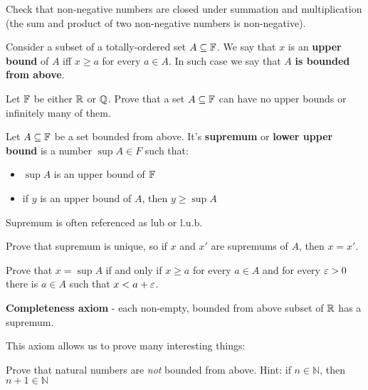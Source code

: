 \begin{exercise}
  Check that non-negative numbers are closed under summation and multiplication (the sum and product of two non-negative numbers is non-negative).
\end{exercise}

\begin{definition}
  Consider a subset of a totally-ordered set $A\subseteq \mathbb F$. We say that $x$ is an
  \textbf{upper bound} of $A$ iff $x\ge a$ for every $a\in A$.
  In such case we say that $A$ \textbf{is bounded from above}.
\end{definition}

\begin{exercise}
  Let $\mathbb F$ be either $\mathbb R$ or $\mathbb Q$. Prove that a set $A\subseteq \mathbb {\mathbb F}$ can have no upper bounds
  or infinitely many of them.
\end{exercise}

\begin{definition}
  Let $A\subseteq \mathbb F$ be a set bounded from above. It's \textbf{supremum} or \textbf{lower upper bound} is a number $\sup A\in F$ such that:
  \begin{itemize}
    \item $\sup A$ is an upper bound of $\mathbb F$
    \item if $y$ is an upper bound of $A$, then $y\ge \sup A$
  \end{itemize}
  Supremum is often referenced as $\text{lub}$ or $\text{l.u.b}$.
\end{definition}

\begin{exercise}
  Prove that supremum is unique, so if $x$ and $x'$ are supremums
  of $A$, then $x=x'$.
\end{exercise}

\begin{exercise}
  Prove that $x=\sup A$ if and only if
  $x\ge a$ for every $a\in A$ and for every $\varepsilon > 0$ there is
  $a\in A$ such that $x < a + \varepsilon$.
\end{exercise}

\begin{definition}
  \textbf{Completeness axiom} - each non-empty, bounded from above subset of $\mathbb R$ has a supremum.
\end{definition}

This axiom allows us to prove many interesting things:

\begin{exercise}
  Prove that natural numbers are \textit{not} bounded from above.
  Hint: if $n\in \mathbb N$, then $n+1\in \mathbb N$
\end{exercise}

